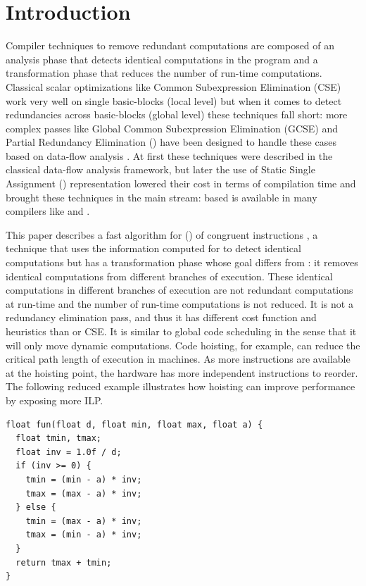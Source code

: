 \documentclass[sigplan,10pt,review,anonymous]{acmart}\settopmatter{printfolios=true,printccs=false,printacmref=false}
\begin{document}
\section{Introduction}
\label{sec:intro}
Compiler techniques to remove redundant computations are composed of an analysis
phase that detects identical computations in the program and a transformation
phase that reduces the number of run-time computations.  Classical scalar
optimizations like Common Subexpression Elimination (CSE) \cite{dragonbook} work
very well on single basic-blocks (local level) but when it comes to detect
redundancies across basic-blocks (global level) these techniques fall short:
more complex passes like Global Common Subexpression Elimination (GCSE) and
Partial Redundancy Elimination (\PRE{}) have been designed to handle these cases
based on data-flow analysis \cite{morel1979global}.  At first these techniques
were described in the classical data-flow analysis framework, but later the use
of Static Single Assignment (\SSA{}) representation lowered their cost in terms
of compilation time \cite{briggs1994effective,chow1997new,kennedy1999partial}
and brought these techniques in the main stream: \SSA{} based \PRE{} is
available in many compilers like \GCC{} and \LLVM{}.

This paper describes a fast algorithm for \gcm{} (\GCM{}) of congruent
instructions \cite{briggs1997}, a technique that uses the information computed
for \PRE{} to detect identical computations but has a transformation phase whose
goal differs from \PRE{}: it removes identical computations from different
branches of execution.  These identical computations in different branches of
execution are not redundant computations at run-time and the number of run-time
computations is not reduced. It is not a redundancy elimination pass, and thus
it has different cost function and heuristics than \PRE{} or CSE. It is similar
to global code scheduling \cite{dragonbook,click1995global} in the sense that it
will only move dynamic computations. Code hoisting, for example, can reduce the
critical path length of execution in \ooo{} machines. As more instructions are
available at the hoisting point, the hardware has more independent instructions
to reorder. The following reduced example illustrates how hoisting can improve
performance by exposing more ILP.

\begin{lstlisting}
float fun(float d, float min, float max, float a) {
  float tmin, tmax;
  float inv = 1.0f / d;
  if (inv >= 0) {
    tmin = (min - a) * inv;
    tmax = (max - a) * inv;
  } else {
    tmin = (max - a) * inv;
    tmax = (min - a) * inv;
  }
  return tmax + tmin;
}
\end{lstlisting}
\end{document}
